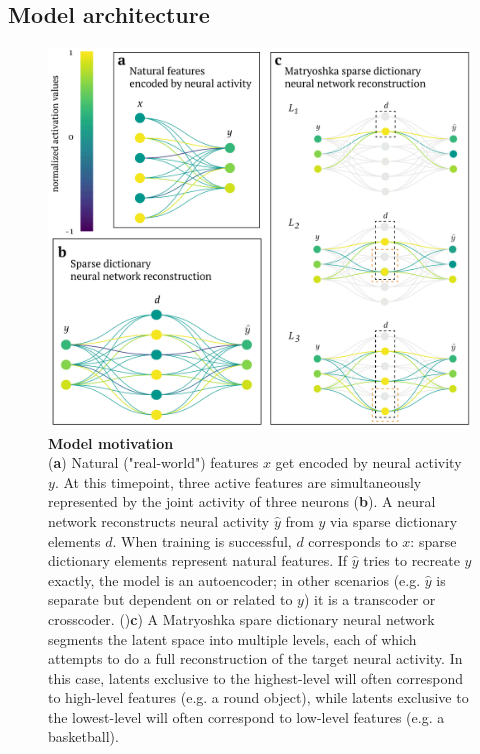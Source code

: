 \subsection{Model architecture}

\begin{figure}[t]
    \begin{minipage}{0.64\linewidth}
    \includegraphics[width=\linewidth]{figures/sdnn_arch.pdf}
    \end{minipage}%
    \begin{minipage}{0.35\linewidth}
    \caption{
        \textbf{Model motivation} \\
        \small
        (\textbf{a}) Natural ("real-world") features $x$ get encoded by neural activity $y$. At this timepoint, three active features are simultaneously represented by the joint activity of three neurons (\textbf{b}). A neural network reconstructs neural activity $\hat{y}$ from $y$ via sparse dictionary elements $d$. When training is successful, $d$ corresponds to $x$: sparse dictionary elements represent natural features. If $\hat{y}$ tries to recreate $y$ exactly, the model is an autoencoder; in other scenarios (e.g. $\hat{y}$ is separate but dependent on or related to $y$) it is a transcoder or crosscoder. ()\textbf{c}) A Matryoshka spare dictionary neural network segments the latent space into multiple levels, each of which attempts to do a full reconstruction of the target neural activity. In this case, latents exclusive to the highest-level will often correspond to high-level features (e.g. a round object), while latents exclusive to the lowest-level will often correspond to low-level features (e.g. a basketball).
    }
    \label{fig:sdnn_arch}
    \end{minipage}
\end{figure}

